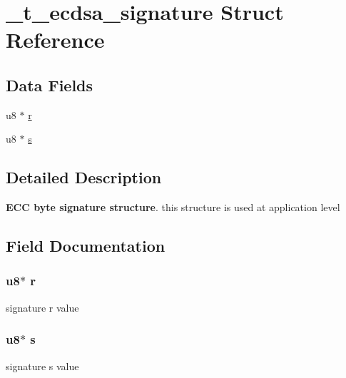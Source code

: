\hypertarget{struct__t__ecdsa__signature}{\section{\+\_\+t\+\_\+ecdsa\+\_\+signature Struct Reference}
\label{struct__t__ecdsa__signature}
}
\subsection*{Data Fields}
\begin{DoxyCompactItemize}
\item 
u8 $\ast$ \hyperlink{struct__t__ecdsa__signature_ad94fd3eb6814b5963e6bc12f2af1fd80}{r}
\item 
u8 $\ast$ \hyperlink{struct__t__ecdsa__signature_aa485375cd3a50ab010ae94f44b55ea01}{s}
\end{DoxyCompactItemize}


\subsection{Detailed Description}
{\bfseries E\+C\+C byte signature structure}. this structure is used at application level 

\subsection{Field Documentation}
\hypertarget{struct__t__ecdsa__signature_ad94fd3eb6814b5963e6bc12f2af1fd80}{
\subsubsection[{r}]{\setlength{\rightskip}{0pt plus 5cm}u8$\ast$ r}}\label{struct__t__ecdsa__signature_ad94fd3eb6814b5963e6bc12f2af1fd80}
signature r value \hypertarget{struct__t__ecdsa__signature_aa485375cd3a50ab010ae94f44b55ea01}{
\subsubsection[{s}]{\setlength{\rightskip}{0pt plus 5cm}u8$\ast$ s}}\label{struct__t__ecdsa__signature_aa485375cd3a50ab010ae94f44b55ea01}
signature s value 